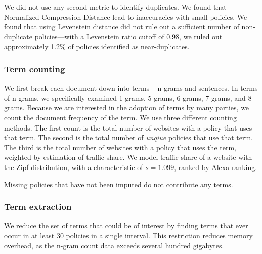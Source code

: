 We did not use any second metric to identify duplicates. We found that Normalized Compression Distance lead to inaccuracies with small policies. We found that using Levenstein distance did not rule out a sufficient number of non-duplicate policies---with a Levenstein ratio cutoff of 0.98, we ruled out approximately 1.2\% of policies identified as near-duplicates.




\subsubsection{Term counting}\label{sec:termcounting}
We first break each document down into  terms -- n-grams and sentences. In terms of n-grams, we specifically examined 1-grams, 5-grams, 6-grams, 7-grams, and 8-grams. Because we are interested in the adoption of terms by many parties, we count the document frequency of the term. We use three different counting methods. The first count is the total number of websites with a policy that uses that term. The second is the total number of \textit{unqiue} policies that use that term. The third is the total number of websites with a policy that uses the term, weighted by estimation of traffic share. We model traffic share of a website with the Zipf distribution, with a characteristic of $s=1.099$\cite{garcia2008duration}, ranked by Alexa ranking.

Missing policies that have not been imputed do not contribute any terms.

\subsubsection{Term extraction}
We reduce the set of terms that could be of interest by finding terms that ever occur in at least 30 policies in a single interval. This restriction reduces memory overhead, as the n-gram count data exceeds several hundred gigabytes.


